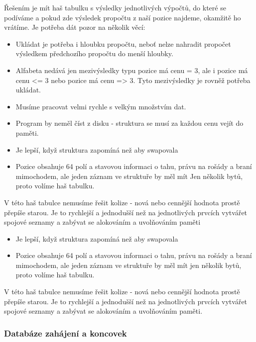 \documentclass[11pt, titlepage]{article}
\begin{document}
Řešením je mít haš tabulku s výsledky jednotlivých výpočtů, do které se podíváme a pokud zde výsledek propočtu z naší pozice najdeme, okamžitě ho vrátíme. Je potřeba dát pozor na několik věcí:
\begin{itemize}
	\item Ukládat je potřeba i hloubku propočtu, neboť nelze nahradit propočet výsledkem předchozího propočtu do menší hloubky.
	\item Alfabeta nedává jen mezivýsledky typu pozice má cenu = 3, ale i pozice má cenu <= 3 nebo pozice má cenu => 3. Tyto mezivýsledky je rovněž potřeba ukládat.
	\item Musíme pracovat velmi rychle s velkým množstvím dat.
	\item Program by neměl číst z disku - struktura se musí za každou cenu vejít do paměti.
	\item Je lepší, když struktura zapomíná než aby swapovala
	\item Pozice obsahuje 64 polí a stavovou informaci o tahu, právu na rošády a braní mimochodem, ale jeden záznam ve struktuře by měl mít Jen několik bytů, proto volíme haš tabulku.
\end{itemize}

V této haš tabulce nemusíme řešit kolize - nová nebo cennější hodnota prostě přepíše starou. Je to rychlejší a jednodušší než na jednotlivých prvcích vytvářet spojové seznamy a zabývat se alokováním a uvolňováním paměti
\begin{itemize}
	\item Je lepší, když struktura zapomíná než aby swapovala
	\item Pozice obsahuje 64 polí a stavovou informaci o tahu, právu na rošády a braní mimochodem, ale jeden záznam ve struktuře by měl mít jen několik bytů, proto volíme haš tabulku.
\end{itemize}

V této haš tabulce nemusíme řešit kolize - nová nebo cennější hodnota prostě přepíše starou. Je to rychlejší a jednodušší než na jednotlivých prvcích vytvářet spojové seznamy a zabývat se alokováním a uvolňováním paměti.

\subsubsection{Databáze zahájení a koncovek}
\end{document}
